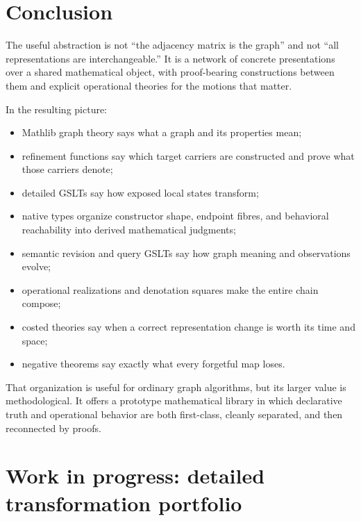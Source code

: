 \documentclass[11pt]{article}
\theoremstyle{remark}
\begin{document}
\section{Conclusion}

The useful abstraction is not ``the adjacency matrix is the graph'' and not
``all representations are interchangeable.''  It is a network of concrete
presentations over a shared mathematical object, with proof-bearing
constructions between them and explicit operational theories for the motions
that matter.

In the resulting picture:
\begin{itemize}[leftmargin=2em]
  \item Mathlib graph theory says what a graph and its properties mean;
  \item refinement functions say which target carriers are constructed and
        prove what those carriers denote;
  \item detailed GSLTs say how exposed local states transform;
  \item native types organize constructor shape, endpoint fibres, and
        behavioral reachability into derived mathematical judgments;
  \item semantic revision and query GSLTs say how graph meaning and
        observations evolve;
  \item operational realizations and denotation squares make the entire chain
        compose;
  \item costed theories say when a correct representation change is worth its
        time and space;
  \item negative theorems say exactly what every forgetful map loses.
\end{itemize}
That organization is useful for ordinary graph algorithms, but its larger
value is methodological.  It offers a prototype mathematical library in which
declarative truth and operational behavior are both first-class, cleanly
separated, and then reconnected by proofs.

\appendix

\section{Work in progress: detailed transformation portfolio}
\label{app:detailed-portfolio}
\end{document}
